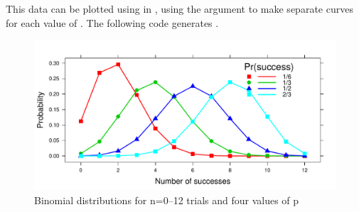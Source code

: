 \documentclass[11pt]{book}
\renewenvironment{knitrout}{\small\renewcommand{\baselinestretch}{.85}}{} %
\begin{document}
This data can be plotted using  in ,
using the  argument to make separate curves for each
value of .  The following code generates .
\begin{knitrout}
\color{fgcolor}\begin{kframe}
\begin{alltt}
 \hlkwb{<-} \hlstd{()[}\hlopt{:}\hlstd{]}
 \hlopt{~}   
  \hlstd{=}\hlstd{(}\hlstd{,} \hlstd{=}\hlstd{),}
  \hlstd{=}\hlstd{(}\hlstd{,}  \hlstd{=}\hlstd{),}
  \hlstd{=}\hlstd{,} \hlstd{=}\hlopt{:}\hlstd{,} \hlstd{=}\hlstd{,} \hlstd{=}\hlstd{,} 
   \hlstd{=} \hlstd{(}
     \hlstd{=} \hlstd{,}
     \hlstd{=} \hlstd{(}\hlstd{=}\hlopt{:}\hlstd{,}  \hlstd{=}\hlstd{),}
     \hlstd{=} \hlstd{(}\hlstd{=}\hlstd{,} 
     \hlstd{=} \hlstd{(}\hlopt{$}
    \hlstd{=}\hlstd{,} \hlstd{=}\hlstd{,} \hlstd{=}\hlstd{(}\hlstd{=}\hlstd{,} \hlstd{=}\hlstd{)}
    \hlstd{)}
  \hlstd{)}
\end{alltt}
\end{kframe}\begin{figure}[!htbp]


\centerline{\includegraphics[width=.75\textwidth]{ch03/fig/dbinom2-plot} }

\caption[Binomial distributions for n=0--12 trials and four values of p]{Binomial distributions for n=0--12 trials and four values of p\label{fig:dbinom2-plot}}
\end{figure}


\end{knitrout}
\end{document}
